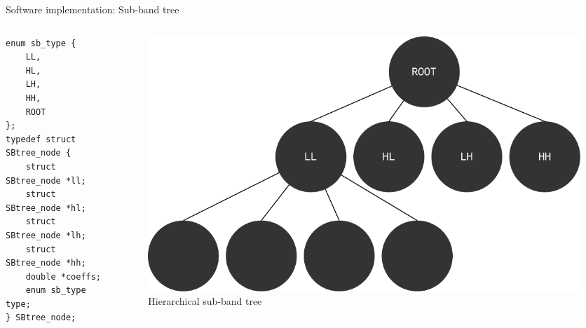 \documentclass{beamer}
\begin{document}
\begin{frame}[fragile]{Software implementation: Sub-band tree}
    \begin{columns}
        \begin{column}{0.5\textwidth}
            \begin{verbatim}
enum sb_type {
    LL,
    HL,
    LH,
    HH,
    ROOT
};
typedef struct SBtree_node {
    struct SBtree_node *ll;
    struct SBtree_node *hl;
    struct SBtree_node *lh;
    struct SBtree_node *hh;
    double *coeffs;
    enum sb_type type;
} SBtree_node;
            \end{verbatim}
        \end{column}
        \begin{column}{0.5\textwidth}
            \begin{figure}[H]
                \centering
                \includegraphics[scale=0.35]{sbtree.pdf}
                \caption{Hierarchical sub-band tree}
            \end{figure}
        \end{column}
    \end{columns}
\end{frame}
\end{document}
